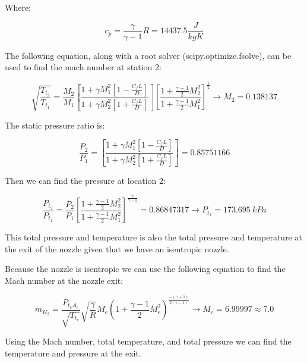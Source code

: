 \documentclass[conf]{new-aiaa}
\begin{document}
Where:

\begin{equation}
    c_p = \frac{\gamma}{\gamma-1} R 
    =14437.5 \frac{J}{kgK}
\end{equation}

The following equation, along with a root solver (scipy.optimize.fsolve), can be used to find the mach number at station 2:

\begin{equation}
    \sqrt{\frac{T_{t_2}}{T_{t_1}}} = 
    \frac{M_2}{M_1} \left[\frac{1+\gamma M_1^2 \left[1-\frac{C_f L}{D}\right]}{1+\gamma M_2^2 \left[1+\frac{C_f L}{D}\right]}\right] 
    \left[\frac{1+\frac{\gamma-1}{2}M_2^2}{1+\frac{\gamma-1}{2}M_1^2}\right]^{\frac{1}{2}}
    \rightarrow M_2= 0.138137
\end{equation}

The static pressure ratio is:

\begin{equation}
    \frac{P_2}{P_1} = 
    \left[\frac{1+\gamma M_1^2 \left[1-\frac{C_f L}{D}\right]}{1+\gamma M_2^2 \left[1+\frac{C_f L}{D}\right]}\right] 
    = 0.85751166
\end{equation}

Then we can find the pressure at location 2:

\begin{equation}
    \frac{P_{t_2}}{P_{t_1}} = 
    \frac{P_2}{P_1}
    \left[\frac{1+\frac{\gamma-1}{2}M_2^2}{1+\frac{\gamma-1}{2}M_1^2}\right]^{\frac{\gamma}{\gamma-1}} 
    = 0.86847317 \rightarrow P_{t_2} = 173.695 \ {kPa}
\end{equation}

This total pressure and temperature is also the total pressure and temperature at the exit of the nozzle given that we have an isentropic nozzle.\newline

Because the nozzle is isentropic we can use the following equation to find the Mach number at the nozzle exit:

\begin{equation}
    \dot{m}_{H_2}= 
    \frac{P_{t_e A_e}}{\sqrt{T_{t_e}}} \sqrt{\frac{\gamma}{R}}
    M_e  (1+ \frac{\gamma-1}{2} M_e^2)^{\frac{-(\gamma+1)}{2 (\gamma-1)}}
    \rightarrow M_e = 6.99997 \approx 7.0
\end{equation}

Using the Mach number, total temperature, and total pressure we can find the temperature and pressure at the exit.\newline
\end{document}
